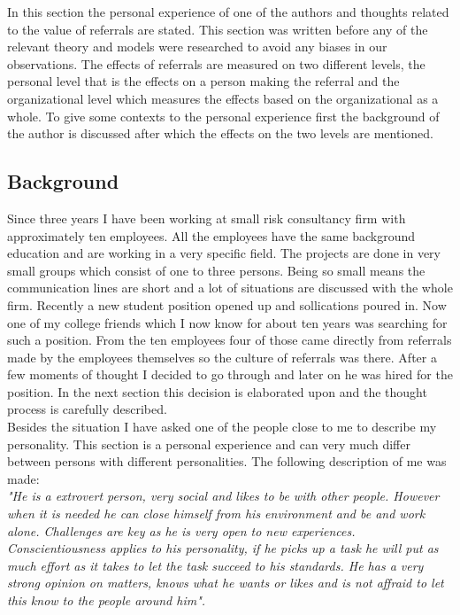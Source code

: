 \documentclass[Main.tex]{subfiles}
\begin{document}
In this section the personal experience of one of the authors and thoughts related to the value of referrals are stated. This section was written before any of the relevant theory and models were researched to avoid any biases in our observations. The effects of referrals are measured on two different levels, the personal level that is the effects on a person making the referral and the organizational level which measures the effects based on the organizational as a whole. To give some contexts to the personal experience first the background of the author is discussed after which the effects on the two levels are mentioned.

\subsection*{Background}

 Since three years I have been working at small risk consultancy firm with approximately ten employees. All the employees have the same background education and are working in a very specific field. The projects are done in very small groups which consist of one to three persons. Being so small means the communication lines are short and a lot of situations are discussed with the whole firm. Recently a new student position opened up and sollications poured in.  Now one of my college friends which I now know for about ten years was searching for such a position. From the ten employees four of those came directly from referrals made by the employees themselves so the culture of referrals was there. After a few moments of thought I decided to go through and later on he was hired for the position. In the next section this decision is elaborated upon and the thought process is carefully described. \\

Besides the situation I have asked one of the people close to me to describe my personality. This section is a personal experience and can very much differ between persons with different personalities. The following description of me was made: \\

\emph{"He is a extrovert person, very social and likes to be with other people. However when it is needed he can close himself from his environment and be and work alone. Challenges are key as he is very open to new experiences. Conscientiousness applies to his personality, if he picks up a task he will put as much effort as it takes to let the task succeed to his standards. He has a very strong opinion on matters, knows what he wants or likes and is not affraid to let this know to the people around him".}
\end{document}
